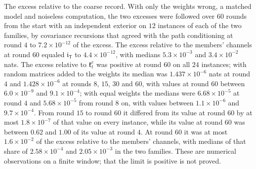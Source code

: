 \begin{numcheck}
The excess relative to the coarse record. With only the weights wrong, a matched model and noiseless computation, the two excesses were followed over $60$ rounds from the start with an independent exterior on $12$ instances of each of the two families, by covariance recursions that agreed with the path conditioning at round $4$ to $7.2\times10^{-12}$ of the excess. The excess relative to the members' channels at round $60$ equaled $\mathfrak i_{\mathsf T}$ to $4.4\times10^{-12}$, with medians $5.3\times10^{-3}$ and $3.4\times10^{-2}$ nats. The excess relative to $\mathfrak k^{\mathrm c}_t$ was positive at round $60$ on all $24$ instances; with random matrices added to the weights its median was $1.437\times10^{-6}$ nats at round $4$ and $1.428\times10^{-6}$ at rounds $8$, $15$, $30$ and $60$, with values at round $60$ between $6.0\times10^{-9}$ and $9.1\times10^{-4}$; with equal weights the medians were $6.68\times10^{-5}$ at round $4$ and $5.68\times10^{-5}$ from round $8$ on, with values between $1.1\times10^{-6}$ and $9.7\times10^{-4}$. From round $15$ to round $60$ it differed from its value at round $60$ by at most $1.8\times10^{-7}$ of that value on every instance, while its value at round $60$ was between $0.62$ and $1.00$ of its value at round $4$. At round $60$ it was at most $1.6\times10^{-2}$ of the excess relative to the members' channels, with medians of that share of $2.58\times10^{-4}$ and $2.05\times10^{-3}$ in the two families. These are numerical observations on a finite window; that the limit is positive is not proved.


\end{numcheck}
